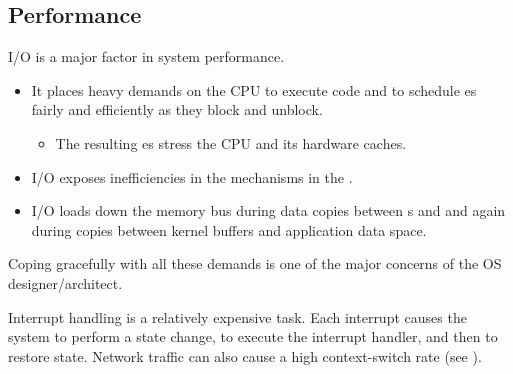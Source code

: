\subsection{Performance}\label{subsec:IO_Subsystem_Performance}
I/O is a major factor in system performance.
\begin{itemize}[noitemsep]
\item It places heavy demands on the CPU to execute  code and to schedule es fairly and efficiently as they block and unblock.
  \begin{itemize}[noitemsep]
  \item The resulting es stress the CPU and its hardware caches.
\end{itemize}
\item I/O exposes inefficiencies in the  mechanisms in the .
\item I/O loads down the memory bus during data copies between s and  and again during copies between kernel buffers and application data space.
\end{itemize}

Coping gracefully with all these demands is one of the major concerns of the OS designer/architect.

Interrupt handling is a relatively expensive task.
Each interrupt causes the system to perform a state change, to execute the interrupt handler, and then to restore state.
Network traffic can also cause a high context-switch rate (see ).

